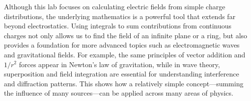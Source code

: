 \documentclass[12pt]{article}
\begin{document}


Although this lab focuses on calculating electric fields from simple charge
distributions, the underlying mathematics is a powerful tool that extends far
beyond electrostatics. Using integrals to sum contributions from continuous
charges not only allows us to find the field of an infinite plane or a ring, but
also provides a foundation for more advanced topics such as electromagnetic
waves and gravitational fields. For example, the same principles of vector
addition and $1/r^2$ forces appear in Newton’s law of gravitation, while in wave
theory, superposition and field integration are essential for understanding
interference and diffraction patterns. This shows how a relatively simple
concept—summing the influence of many sources—can be applied across many areas
of physics.
\end{document}
